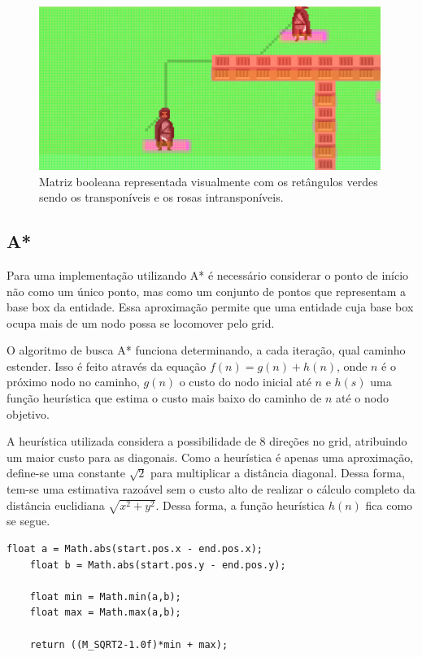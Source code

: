 \documentclass[12pt, 
openright, 
oneside, 
a4paper,    
brazil]{facom-ufu-abntex2}
\begin{document}
\begin{figure}[H]
	\centering
	\includegraphics[width=30em]{imagens/pathPlanningWithGrid.png}
	\caption{Matriz booleana representada visualmente com os retângulos verdes sendo os transponíveis e os rosas intransponíveis. }
\end{figure}

\subsection{A*}
Para uma implementação utilizando A* é necessário considerar o ponto de início não como um único ponto, mas como um conjunto de pontos que representam a base box da entidade. Essa aproximação permite que uma entidade cuja base box ocupa mais de um nodo possa se locomover pelo grid.

O algoritmo de busca A* funciona determinando, a cada iteração, qual caminho estender. Isso é feito através da equação $f(n) = g(n) + h(n)$, onde $n$ é o próximo nodo no caminho, $g(n)$ o custo do nodo inicial até $n$ e $h(s)$ uma função heurística que estima o custo mais baixo do caminho de $n$ até o nodo objetivo.

A heurística utilizada considera a possibilidade de 8 direções no grid, atribuindo um maior custo para as diagonais. Como a heurística é apenas uma aproximação, define-se uma constante $\sqrt{2}$ para multiplicar a distância diagonal. Dessa forma, tem-se uma estimativa razoável sem o custo alto de realizar o cálculo completo da distância euclidiana $\sqrt{x^2 + y^2}$. Dessa forma, a função heurística $h(n)$ fica como se segue.

\begin{lstlisting}[caption= Heurística utilizada no A*]
    float a = Math.abs(start.pos.x - end.pos.x);
    float b = Math.abs(start.pos.y - end.pos.y);
    
    float min = Math.min(a,b);
    float max = Math.max(a,b);
    
    return ((M_SQRT2-1.0f)*min + max);
\end{lstlisting}
\end{document}
